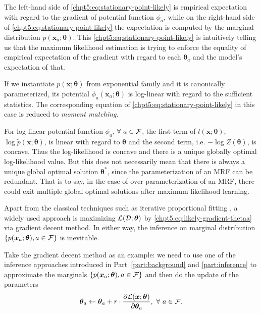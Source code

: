 The left-hand side of \eqref{chpt5:eq:stationary-point-likely} is empirical expectation with regard to the gradient of potential function $\phi_a$, while on the right-hand side of \eqref{chpt5:eq:stationary-point-likely} the expectation is computed by the marginal distribution $p(\bm{x}_a; \bm{\theta})$. This \eqref{chpt5:eq:stationary-point-likely} is intuitively telling us that the maximum likelihood estimation is trying to enforce the equality of empirical expectation of the gradient with regard to each $\bm{\theta}_a$ and the model's expectation of that.
\begin{remark}
  If we instantiate $p(\bm{x};\bm{\theta})$ from exponential family and it is canonically parameterized, its potential $\phi_a(\bm{x}_a; \bm{\theta})$ is log-linear with regard to the sufficient statistics. The corresponding equation of \eqref{chpt5:eq:stationary-point-likely} in this case is reduced to \textit{moment matching}.

  For log-linear potential function $\phi_a$, $\forall ~a \in \mathcal{F}$, the first term of $l(\bm{x}; \bm{\theta})$, $\log{\tilde{p}(\bm{x};\bm{\theta})}$, is linear with regard to $\bm{\theta}$ and the second term, i.e. $-\log{Z(\bm{\theta})}$, is concave. Thus the log-likelihood is concave and there is a unique globally optimal log-likelihood value. But this does not necessarily mean that there is always a unique global optimal solution $\bm{\theta}^{\ast}$, since the parameterization of an MRF can be redundant. That is to say, in the case of over-parameterization of an MRF, there could exit multiple global optimal solutions after maximum likelihood learning.
  
\end{remark}

Apart from the classical techniques such as iterative proportional fitting \cite[Section~6.1]{wainwright2008graphical}\cite{eric10-708ipf}, a widely used approach is maximizing $\mathcal{L}(\mathcal{D}; \bm{\theta})$ by \eqref{chpt5:eq:likely-gradient-thetaa} via gradient decent method. In either way, the inference on marginal distribution $\left\{ p(\bm{x}_a; \bm{\theta}), a \in \mathcal{F} \right\}$ is inevitable.

Take the gradient decent method as an example: we need to use one of the inference approaches introduced in Part~\ref{part:background} and \ref{part:inference} to approximate the marginals $\left\{ p(\bm{x}_a; \bm{\theta}), a \in \mathcal{F} \right\}$ and then do the update of the parameters
\begin{equation}
  \bm{\theta}_a \leftarrow \bm{\theta}_a + r \cdot \frac{ \partial \mathcal{L}(\bm{x};\bm{\theta})}{\partial \bm{\theta}_a}, ~\forall~a \in \mathcal{F}.
\end{equation}

